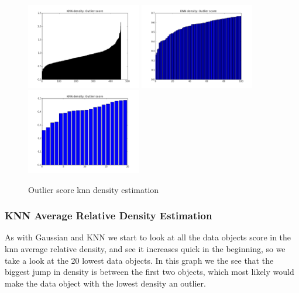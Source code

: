 \begin{figure}[H]
\centering
\includegraphics[width=5cm, keepaspectratio=true]{pictures/knndensityEstimationAll.png}
\includegraphics[width=5cm, keepaspectratio=true]{pictures/knndensityEstimation100.png}
\includegraphics[width=5cm, keepaspectratio=true]{pictures/knndensityEstimation20.png}
\vspace{-0.4cm}
\caption{\footnotesize Outlier score knn density estimation}
\label{knn}
\end{figure}

\subsubsection{KNN Average Relative Density Estimation}

As with Gaussian and KNN we start to look at all the data objects score in the knn average relative density, and see it increases quick in the beginning, so we take a look at the 20 lowest data objects. In this graph we the see that the biggest jump in density is between the first two objects, which most likely would make the data object with the lowest density an outlier.


